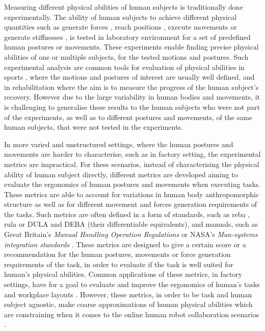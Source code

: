 Measuring different physical abilities of human subjects is traditionally done experimentally. The ability of human subjects to achieve different physical quantities such as generate forces \cite{HODDER2016Testing,HOLZBAUR20072442}, reach positions \cite{CASTRO2019108}, execute movements \cite{Jessop2016} or generate stiffnesses \cite{Tsuji1995,Artemiadis2010}, is tested in laboratory environment for a set of predefined human postures or movements. These experiments enable finding precise physical abilities of one or multiple subjects, for the tested motions and postures.  Such experimental analysis are common tools for evaluation of physical abilities in sports \cite{Jessop2016}, where the motions and postures of interest are usually well defined, and in rehabilitation \cite{HAISMA2006741} where the aim is to measure the progress of the human subject's recovery. However due to the large variability in human bodies and movements, it is challenging to generalise these results to the human subjects who were not part of the experiments, as well as to different postures and movements, of the same human subjects, that were not tested in the experiments.

In more varied and unstructured settings, where the human postures and movements are harder to characterise, such as in factory setting, the experimental metrics are impractical. For these scenarios, instead of characterising the physical ability of human subject directly, different metrics are developed aiming to evaluate the ergonomics of human postures and movements when executing tasks. These metrics are able to account for variations in human body anthropomorphic structure as well as for different movement and forces generation requirements of the tasks. Such metrics are often defined in a form of standards, such as \gls{reba} \cite{reba}, \gls{rula} \cite{rula} or DULA and DEBA \cite{Yazdani2022} (their differentiable equivalents), and manuals, such as Great Britain's \textit{Manual Handling Operation Regulations} \cite{health1992manual} or NASA's \textit{Man-systems integration standards} \cite{nasa}. These metrics are designed to give a certain score or a recommendation for the human postures, movements or force generation requirements of the task, in order to evaluate if the task is well suited for human's physical abilities. Common applications of these metrics, in factory settings, have for a goal to evaluate and improve the ergonomics of human's tasks \cite{Busch2017} and workplace layouts \cite{ORE20161, Lietaert2019}. However, these metrics, in order to be task and human subject agnostic, make coarse approximations of human physical abilities which are constraining when it comes to the online human robot collaboration scenarios \cite{maurice2015}. 

